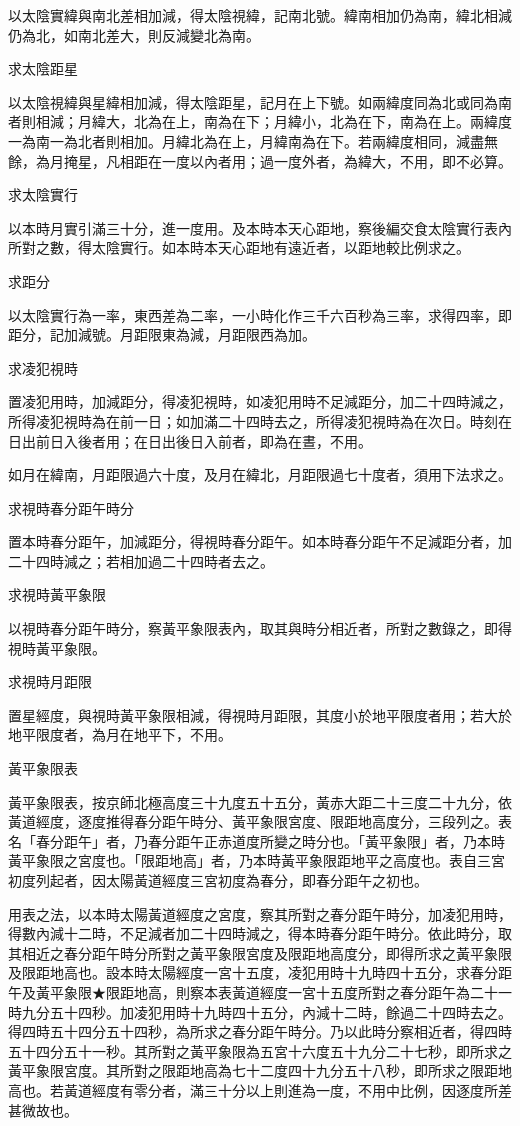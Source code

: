 \begin{pinyinscope}
以太陰實緯與南北差相加減，得太陰視緯，記南北號。緯南相加仍為南，緯北相減仍為北，如南北差大，則反減變北為南。

求太陰距星

以太陰視緯與星緯相加減，得太陰距星，記月在上下號。如兩緯度同為北或同為南者則相減；月緯大，北為在上，南為在下；月緯小，北為在下，南為在上。兩緯度一為南一為北者則相加。月緯北為在上，月緯南為在下。若兩緯度相同，減盡無餘，為月掩星，凡相距在一度以內者用；過一度外者，為緯大，不用，即不必算。

求太陰實行

以本時月實引滿三十分，進一度用。及本時本天心距地，察後編交食太陰實行表內所對之數，得太陰實行。如本時本天心距地有遠近者，以距地較比例求之。

求距分

以太陰實行為一率，東西差為二率，一小時化作三千六百秒為三率，求得四率，即距分，記加減號。月距限東為減，月距限西為加。

求凌犯視時

置凌犯用時，加減距分，得凌犯視時，如凌犯用時不足減距分，加二十四時減之，所得凌犯視時為在前一日；如加滿二十四時去之，所得凌犯視時為在次日。時刻在日出前日入後者用；在日出後日入前者，即為在晝，不用。

如月在緯南，月距限過六十度，及月在緯北，月距限過七十度者，須用下法求之。

求視時春分距午時分

置本時春分距午，加減距分，得視時春分距午。如本時春分距午不足減距分者，加二十四時減之；若相加過二十四時者去之。

求視時黃平象限

以視時春分距午時分，察黃平象限表內，取其與時分相近者，所對之數錄之，即得視時黃平象限。

求視時月距限

置星經度，與視時黃平象限相減，得視時月距限，其度小於地平限度者用；若大於地平限度者，為月在地平下，不用。

黃平象限表

黃平象限表，按京師北極高度三十九度五十五分，黃赤大距二十三度二十九分，依黃道經度，逐度推得春分距午時分、黃平象限宮度、限距地高度分，三段列之。表名「春分距午」者，乃春分距午正赤道度所變之時分也。「黃平象限」者，乃本時黃平象限之宮度也。「限距地高」者，乃本時黃平象限距地平之高度也。表自三宮初度列起者，因太陽黃道經度三宮初度為春分，即春分距午之初也。

用表之法，以本時太陽黃道經度之宮度，察其所對之春分距午時分，加凌犯用時，得數內減十二時，不足減者加二十四時減之，得本時春分距午時分。依此時分，取其相近之春分距午時分所對之黃平象限宮度及限距地高度分，即得所求之黃平象限及限距地高也。設本時太陽經度一宮十五度，凌犯用時十九時四十五分，求春分距午及黃平象限★限距地高，則察本表黃道經度一宮十五度所對之春分距午為二十一時九分五十四秒。加凌犯用時十九時四十五分，內減十二時，餘過二十四時去之。得四時五十四分五十四秒，為所求之春分距午時分。乃以此時分察相近者，得四時五十四分五十一秒。其所對之黃平象限為五宮十六度五十九分二十七秒，即所求之黃平象限宮度。其所對之限距地高為七十二度四十九分五十八秒，即所求之限距地高也。若黃道經度有零分者，滿三十分以上則進為一度，不用中比例，因逐度所差甚微故也。


\end{pinyinscope}
